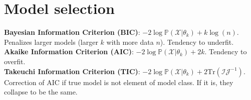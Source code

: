 \section*{Model selection}
\textbf{Bayesian Information Criterion (BIC)}: $-2\log\mathbb{P}(\mathcal{X}|\theta_k)+k\log(n)$. Penalizes larger models (larger $k$ with more data $n$). Tendency to underfit.\\
\textbf{Akaike Information Criterion (AIC)}: $-2\log\mathbb{P}(\mathcal{X}|\theta_k)+2k$. Tendency to overfit.\\
\textbf{Takeuchi Information Criterion (TIC)}: $-2\log\mathbb{P}(\mathcal{X}|\theta_k)+2\text{Tr}(\mathcal{I}\mathcal{J}^{-1})$. \\ Correction of AIC if true model is not element of model class. If it is, they collapse to be the same.